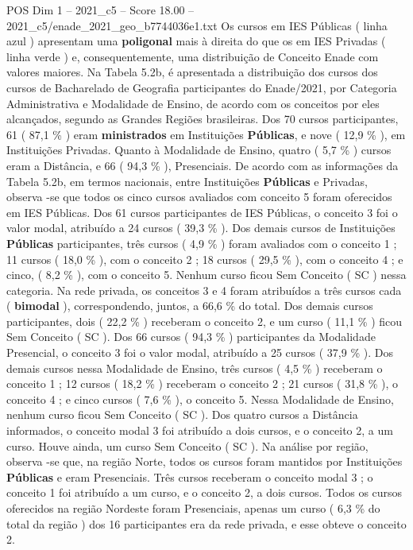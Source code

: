 \begin{textsample}{POS Dim 1 – 2021\_c5 – Score 18.00 – 2021\_c5/enade\_2021\_geo\_b7744036e1.txt}
Os cursos em IES Públicas ( linha azul ) apresentam uma \textbf{poligonal} mais à direita do que os em IES Privadas ( linha verde ) e, consequentemente, uma distribuição de Conceito Enade com valores maiores.
Na Tabela 5.2b, é apresentada a distribuição dos cursos dos cursos de Bacharelado de Geografia participantes do Enade/2021, por Categoria Administrativa e Modalidade de Ensino, de acordo com os conceitos por eles alcançados, segundo as Grandes Regiões brasileiras.
Dos 70 cursos participantes, 61 ( 87,1 \% ) eram \textbf{ministrados} em Instituições \textbf{Públicas}, e nove ( 12,9 \% ), em Instituições Privadas.
Quanto à Modalidade de Ensino, quatro ( 5,7 \% ) cursos eram a Distância, e 66 ( 94,3 \% ), Presenciais.
De acordo com as informações da Tabela 5.2b, em termos nacionais, entre Instituições \textbf{Públicas} e Privadas, observa -se que todos os cinco cursos avaliados com conceito 5 foram oferecidos em IES Públicas.
Dos 61 cursos participantes de IES Públicas, o conceito 3 foi o valor modal, atribuído a 24 cursos ( 39,3 \% ).
Dos demais cursos de Instituições \textbf{Públicas} participantes, três cursos ( 4,9 \% ) foram avaliados com o conceito 1 ; 11 cursos ( 18,0 \% ), com o conceito 2 ; 18 cursos ( 29,5 \% ), com o conceito 4 ; e cinco, ( 8,2 \% ), com o conceito 5.
Nenhum curso ficou Sem Conceito ( SC ) nessa categoria.
Na rede privada, os conceitos 3 e 4 foram atribuídos a três cursos cada ( \textbf{bimodal} ), correspondendo, juntos, a 66,6 \% do total.
Dos demais cursos participantes, dois ( 22,2 \% ) receberam o conceito 2, e um curso ( 11,1 \% ) ficou Sem Conceito ( SC ).
Dos 66 cursos ( 94,3 \% ) participantes da Modalidade Presencial, o conceito 3 foi o valor modal, atribuído a 25 cursos ( 37,9 \% ).
Dos demais cursos nessa Modalidade de Ensino, três cursos ( 4,5 \% ) receberam o conceito 1 ; 12 cursos ( 18,2 \% ) receberam o conceito 2 ; 21 cursos ( 31,8 \% ), o conceito 4 ; e cinco cursos ( 7,6 \% ), o conceito 5.
Nessa Modalidade de Ensino, nenhum curso ficou Sem Conceito ( SC ).
Dos quatro cursos a Distância informados, o conceito modal 3 foi atribuído a dois cursos, e o conceito 2, a um curso.
Houve ainda, um curso Sem Conceito ( SC ).
Na análise por região, observa -se que, na região Norte, todos os cursos foram mantidos por Instituições \textbf{Públicas} e eram Presenciais.
Três cursos receberam o conceito modal 3 ; o conceito 1 foi atribuído a um curso, e o conceito 2, a dois cursos.
Todos os cursos oferecidos na região Nordeste foram Presenciais, apenas um curso ( 6,3 \% do total da região ) dos 16 participantes era da rede privada, e esse obteve o conceito 2.

\end{textsample}

